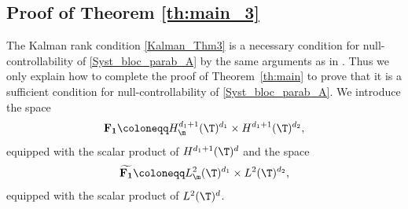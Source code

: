 \subsection{Proof of Theorem \ref{th:main_3}}

The Kalman rank condition \eqref{Kalman_Thm3} is a necessary condition for null-controllability of \eqref{Syst_bloc_parab_A} by the same arguments as in . Thus we only explain how to complete the proof of Theorem~\ref{th:main} to prove that it is a sufficient condition for null-controllability of \eqref{Syst_bloc_parab_A}. We introduce the space
\begin{equation}
\label{defInvQuantPar}
\mathbf{F_1} \coloneqq H^{d_1+1}_\m(\T)^{d_1} \times H^{d_1+1}(\T)^{d_2},
\end{equation}
equipped with the scalar product of $H^{d_1+1}(\T)^{d}$
and the space
\begin{equation}
\label{defInvQuantParAdj}
\widetilde{\mathbf{F_1}} \coloneqq L^{2}_\m(\T)^{d_1} \times L^2(\T)^{d_2},
\end{equation}
equipped with the scalar product of $L^2(\T)^d$.

